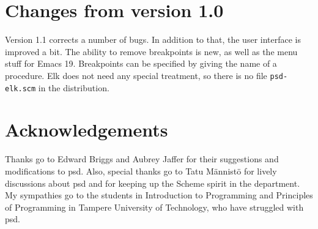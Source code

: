 \section{Changes from version 1.0}

Version 1.1 corrects a number of bugs. In addition to that, the user
interface is improved a bit. The ability to remove breakpoints is new,
as well as the menu stuff for Emacs 19. Breakpoints can be specified
by giving the name of a procedure. Elk does not need any special
treatment, so there is no file {\tt psd-elk.scm} in the distribution.

\section{Acknowledgements}

Thanks go to Edward Briggs and Aubrey Jaffer for their suggestions and
modifications to psd. Also, special thanks go to Tatu M\"annist\"o for
lively discussions about psd and for keeping up the Scheme spirit in
the department. My sympathies go to the students in Introduction to
Programming and Principles of Programming in Tampere University of
Technology, who have struggled with psd.




